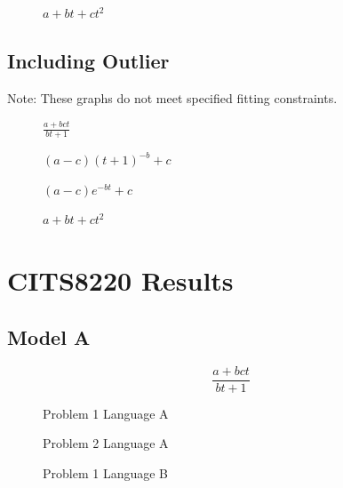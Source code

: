 \documentclass[a4paper,10pt]{article}
\begin{document}
\begin{appendices}
  \begin{figure}[!htb]
  \centering
  
  \caption{$a+bt+ct^2$}
  \end{figure}
  
  \clearpage
  \subsection{Including Outlier}
  \label{subsec:inclout}
  
  Note: These graphs do not meet specified fitting constraints.
  
  \begin{figure}[!htb]
  \centering
  
  \caption{$\frac{a+bct}{bt+1}$}
  \end{figure}
  
  \begin{figure}[!htb]
  \centering
  
  \caption{$(a-c)(t+1)^{-b}+c$}
  \end{figure}
  
  \begin{figure}[!htb]
  \centering
  
  \caption{$(a-c) e^{-bt} + c$}
  \end{figure}
  
  \begin{figure}[!htb]
  \centering
  
  \caption{$a+bt+ct^2$}
  \end{figure}  

  \clearpage
  \section{CITS8220 Results}
  \label{sec:cits8220results}
  
  \subsection{Model A}
  $$\frac{a+bct}{bt+1}$$
  
  \begin{figure}[!htb]
  \centering
  
  \caption{Problem 1 Language A}
  \end{figure}
  
  \begin{figure}[!htb]
  \centering
  
  \caption{Problem 2 Language A}
  \end{figure}
  
  \begin{figure}[!htb]
  \centering
  
  \caption{Problem 1 Language B}
  \end{figure}
  

\end{appendices}
\end{document}
